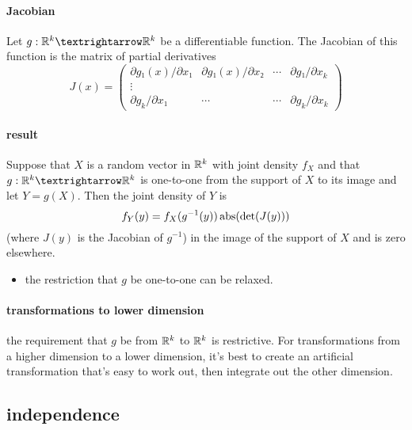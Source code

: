 \paragraph{Jacobian}
      Let $g: \RR^k → \RR^k$ be a differentiable function.  The
      Jacobian of this function is the matrix of partial derivatives
      \[ J(x) =
      \begin{pmatrix} ∂g₁(x)/∂x₁ & ∂g₁(x)/∂x₂ & ⋯ & ∂g₁/∂x_k \\
      ⋮ \\
      ∂g_k/∂x₁ & ⋯ & ⋯ & ∂g_k/∂x_k
      \end{pmatrix} \]

\paragraph{result \citep[B.7.7]{Gre12}}
Suppose that $X$ is a random vector in $\mathbb{R}^k$ with joint density
$f_X$ and that $g: \RR^k → \RR^k$ is one-to-one from the support of
$X$ to its image and let $Y = g(X)$.  Then the joint density of $Y$ is
\[ f_Y(y) = f_X(g^{-1}(y)) \operatorname{abs}(\det( J(y) ))\]
(where $J(y)$ is the Jacobian of $g^{-1}$) in the image of the support
of $X$ and is zero elsewhere.
\begin{itemize}
\item the restriction that $g$ be one-to-one can be relaxed.
\end{itemize}

\paragraph{transformations to lower dimension}
      the requirement that $g$ be from $\mathbb{R}^k$ to $\mathbb{R}^k$ is restrictive.
      For transformations from a higher dimension to a lower dimension,
      it's best to create an artificial transformation that's easy to
      work out, then integrate out the other dimension.

\subsection{independence}

